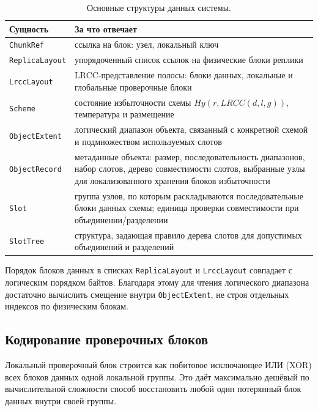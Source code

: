 \begin{center}
\begin{longtable}{|p{}|p{}|}
\caption{\label{tab:implementation-classes}
Основные структуры данных системы.}\\
\hline
Сущность & За что отвечает \\
\hline
\texttt{ChunkRef} & ссылка на блок: узел, локальный ключ \\
\hline
\texttt{ReplicaLayout} & упорядоченный список ссылок на физические блоки реплики \\
\hline
\texttt{LrccLayout} & LRCC-представление полосы: блоки данных, локальные и глобальные проверочные блоки \\
\hline
\texttt{Scheme} & состояние избыточности схемы $Hy(r, LRCC(d, l, g))$, температура и размещение \\
\hline
\texttt{ObjectExtent} & логический диапазон объекта, связанный с конкретной схемой и подмножеством используемых слотов \\
\hline
\texttt{ObjectRecord} & метаданные объекта: размер, последовательность диапазонов, набор слотов, дерево совместимости слотов, выбранные узлы для локализованного хранения блоков избыточности \\
\hline
\texttt{Slot} & группа узлов, по которым раскладываются последовательные блоки данных схемы; единица проверки совместимости при объединении/разделении \\
\hline
\texttt{SlotTree} & структура, задающая правило дерева слотов для допустимых объединений и разделений \\
\hline
\end{longtable}
\end{center}

Порядок блоков данных в списках \texttt{ReplicaLayout} и \texttt{LrccLayout}
совпадает с логическим порядком байтов. Благодаря этому для чтения логического
диапазона достаточно вычислить смещение внутри \texttt{ObjectExtent}, не
строя отдельных индексов по физическим блокам.

\subsection{Кодирование проверочных блоков}

Локальный проверочный блок строится как побитовое исключающее ИЛИ (XOR) всех
блоков данных одной локальной группы. Это даёт максимально дешёвый по
вычислительной сложности способ восстановить любой один потерянный блок данных
внутри своей группы.

